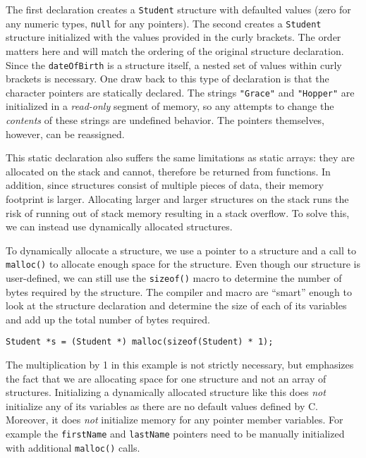 The first declaration creates a \texttt{Student} structure
with defaulted values (zero for any numeric types, \texttt{null}
for any pointers).  The second creates a \texttt{Student}
structure initialized with the values provided in the curly brackets.
The order matters here and will match the ordering of the original
structure declaration.  Since the \texttt{dateOfBirth} is a
structure itself, a nested set of values within curly brackets is 
necessary.  One draw back to this type of declaration is that the
character pointers are statically declared.  The strings \texttt{"Grace"} and \texttt{"Hopper"} are initialized in a 
\emph{read-only} segment of memory, so any attempts to change
the \emph{contents} of these strings are undefined behavior.  
The pointers themselves, however, can be reassigned.

This static declaration also suffers the same limitations as
static arrays: they are allocated on the stack and cannot, therefore
be returned from functions.  In addition, since structures consist
of multiple pieces of data, their memory footprint is larger.  
Allocating larger and larger structures on the stack runs the
risk of running out of stack memory resulting in a stack overflow.
To solve this, we can instead use dynamically allocated structures.

To dynamically allocate a structure, we use a pointer to a structure
and a call to \texttt{malloc()} to allocate enough space
for the structure.  Even though our structure is user-defined, we
can still use the \texttt{sizeof()} macro to determine
the number of bytes required by the structure.  The compiler and
macro are ``smart'' enough to look at the structure declaration and
determine the size of each of its variables and add up the total
number of bytes required.

\begin{verbatim}
Student *s = (Student *) malloc(sizeof(Student) * 1);
\end{verbatim}

The multiplication by 1 in this example is not strictly necessary, but
emphasizes the fact that we are allocating space for one structure
and not an array of structures.  Initializing a dynamically allocated
structure like this does \emph{not} initialize any of its variables
as there are no default values defined by C.  Moreover, it does 
\emph{not} initialize memory for any pointer member variables.  For
example the \texttt{firstName} and \texttt{lastName}
pointers need to be manually initialized with additional 
\texttt{malloc()} calls.

